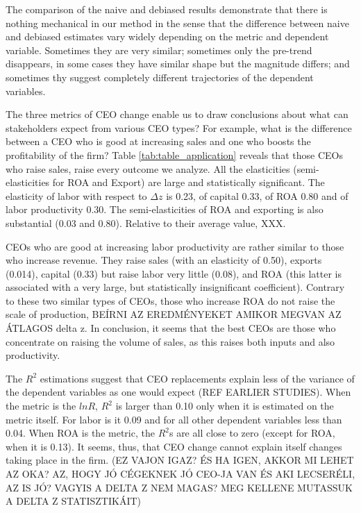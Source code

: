 \documentclass[11pt,a4paper]{article}
\begin{document}
The comparison of the naive and debiased results demonstrate that there is nothing mechanical in our method in the sense that the difference between naive and debiased estimates vary widely depending on the metric and dependent variable. Sometimes they are very similar; sometimes only the pre-trend disappears, in some cases they have similar shape but the magnitude differs; and sometimes thy suggest completely different trajectories of the dependent variables.

The three metrics of CEO change enable us to draw conclusions about what can stakeholders expect from various CEO types? For example, what is the difference between a CEO who is good at increasing sales and one who boosts the profitability of the firm? Table \ref{tab:table_application} reveals that those CEOs who raise sales, raise every outcome we analyze. All the elasticities (semi-elasticities for ROA and Export) are large and statistically significant. The elasticity of labor with respect to $\Delta z$ is 0.23, of capital 0.33, of ROA 0.80 and of labor productivity 0.30. The semi-elasticities of ROA and exporting is also substantial (0.03 and 0.80). Relative to their average value, XXX.

CEOs who are good at increasing labor productivity are rather similar to those who increase revenue. They raise sales (with an elasticity of 0.50), exports (0.014), capital (0.33) but raise labor very little (0.08), and ROA (this latter is associated with a very large, but statistically insignificant coefficient). Contrary to these two similar types of CEOs, those who increase ROA do not raise the scale of production, BEÍRNI AZ EREDMÉNYEKET AMIKOR MEGVAN AZ ÁTLAGOS delta z. In conclusion, it seems that the best CEOs are those who concentrate on raising the volume of sales, as this raises both inputs and also productivity. 

The $R^2$ estimations suggest that CEO replacements explain less of the variance of the dependent variables as one would expect (REF EARLIER STUDIES). When the metric is the $lnR$, $R^2$ is larger than 0.10 only when it is estimated on the metric itself. For labor is it 0.09 and for all other dependent variables less than 0.04. When ROA is the metric, the $R^2$s are all close to zero (except for ROA, when it is 0.13). It seems, thus, that CEO change cannot explain itself changes taking place in the firm. (EZ VAJON IGAZ? ÉS HA IGEN, AKKOR MI LEHET AZ OKA? AZ, HOGY JÓ CÉGEKNEK JÓ CEO-JA VAN ÉS AKI LECSERÉLI, AZ IS JÓ? VAGYIS A DELTA Z NEM MAGAS? MEG KELLENE MUTASSUK A DELTA Z STATISZTIKÁIT)
\end{document}
